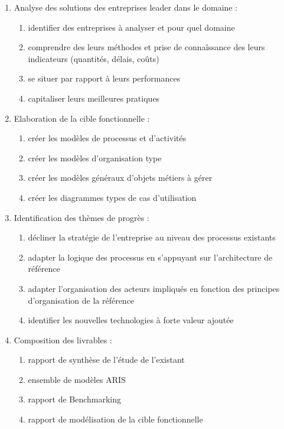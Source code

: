 \begin{enumerate}
\begin{enumerate}
\begin{enumerate}
                \end{enumerate}
            \item Analyse des solutions des entreprises leader dans le domaine : 
                \begin{enumerate}
                  \item identifier des entreprises à analyser et pour quel domaine 
                  \item comprendre des leurs méthodes et prise de connaîssance des leurs indicateurs (quantités, délais, coûts) 
                  \item se situer par rapport à leurs performances
                  \item capitaliser leurs meilleures pratiques
                \end{enumerate}
            \item Elaboration de la cible fonctionnelle : 
                \begin{enumerate}
                  \item créer les modèles de processus et d'activités
                  \item créer les modèles d'organisation type
                  \item créer les modèles généraux d'objets métiers à gérer
                  \item créer les diagrammes types de cas d'utilisation
                \end{enumerate}
            \item Identification des thèmes de progrès : 
                \begin{enumerate}
                  \item décliner la stratégie de l'entreprise au niveau des processus existants 
                  \item adapter la logique des processus en s'appuyant sur l'architecture de référence
                  \item adapter l'organisation des acteurs impliqués en fonction des principes d'organisation de la référence
                  \item identifier les nouvelles technologies à forte valeur ajoutée
                \end{enumerate}
            \item Composition des livrables : 
                \begin{enumerate}
                  \item rapport de synthèse de l'étude de l'existant
                  \item ensemble de modèles ARIS 
                  \item rapport de Benchmarking
                  \item rapport de modélisation de la cible fonctionnelle
                \end{enumerate}
          \end{enumerate}


\end{enumerate}
